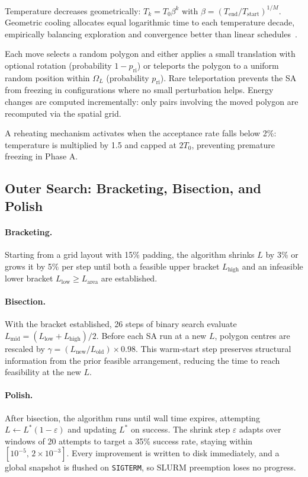 \documentclass[10pt,twocolumn]{article}
\begin{document}
Temperature decreases geometrically: $T_k = T_0\beta^k$ with
$\beta = (T_{\mathrm{end}}/T_{\mathrm{start}})^{1/M}$. Geometric
cooling allocates equal logarithmic time to each temperature decade,
empirically balancing exploration and convergence better than linear
schedules~\cite{Hajek1988}.

Each move selects a random polygon and either applies a small
translation with optional rotation (probability $1-p_{\mathrm{ri}}$)
or teleports the polygon to a uniform random position within $\Omega_L$
(probability $p_{\mathrm{ri}}$). Rare teleportation prevents the SA
from freezing in configurations where no small perturbation helps.
Energy changes are computed incrementally: only pairs involving the
moved polygon are recomputed via the spatial grid.

A reheating mechanism activates when the acceptance rate falls below
2\%: temperature is multiplied by 1.5 and capped at $2T_0$, preventing
premature freezing in Phase A.

\subsection{Outer Search: Bracketing, Bisection, and Polish}
\label{sec:outer}

\paragraph{Bracketing.}
Starting from a grid layout with 15\% padding, the algorithm shrinks
$L$ by 3\% or grows it by 5\% per step until both a feasible upper
bracket $L_{\mathrm{high}}$ and an infeasible lower bracket
$L_{\mathrm{low}} \geq L_{\mathrm{area}}$ are established.

\paragraph{Bisection.}
With the bracket established, 26 steps of binary search evaluate
$L_{\mathrm{mid}} = (L_{\mathrm{low}} + L_{\mathrm{high}})/2$. Before
each SA run at a new $L$, polygon centres are rescaled by
$\gamma = (L_{\mathrm{new}}/L_{\mathrm{old}})\times 0.98$. This
warm-start step preserves structural information from the prior feasible
arrangement, reducing the time to reach feasibility at the new $L$.

\paragraph{Polish.}
After bisection, the algorithm runs until wall time expires, attempting
$L \leftarrow L^*(1-\varepsilon)$ and updating $L^*$ on success. The
shrink step $\varepsilon$ adapts over windows of 20 attempts to target
a 35\% success rate, staying within $[10^{-5},\,2\times 10^{-3}]$.
Every improvement is written to disk immediately, and a global snapshot
is flushed on \texttt{SIGTERM}, so SLURM preemption loses no progress.
\end{document}
